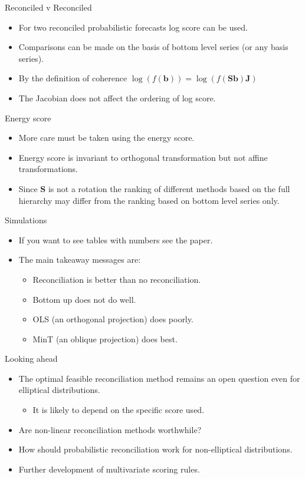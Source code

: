\documentclass{beamer}
\begin{document}
  \begin{frame}{Reconciled v Reconciled}
	\begin{itemize}
		\item For two reconciled probabilistic forecasts log score can be used.
		\item Comparisons can be made on the basis of bottom level series (or any basis series).
		\item By the definition of coherence $\log (f({\bm b}))=\log (f({\bm S}{\bm b}){\bm J})$
		\item The Jacobian does not affect the ordering of log score.
	\end{itemize}
  \end{frame}
  \begin{frame}{Energy  score}
  	\begin{itemize}
  		\item More care must be taken using the energy score.
  		\item Energy score is invariant to orthogonal transformation but not affine transformations.
  		\item Since ${\bm S}$ is not a rotation the ranking of different methods based on the full hierarchy may differ from the ranking based on bottom level series only.
  	\end{itemize}
  \end{frame}
   \begin{frame}{Simulations}
   	\begin{itemize}
   		\item If you want to see tables with numbers see the paper.
   		\item The main takeaway messages are:
   		    \begin{itemize}
   		    	\item Reconciliation is better than no reconciliation.
   		    	\item Bottom up does not do well.
   		    	\item OLS (an orthogonal projection) does poorly.
   		    	\item MinT (an oblique projection) does best.
   		    \end{itemize} 
   	\end{itemize}
   \end{frame}
   \begin{frame}{Looking ahead}
     \begin{itemize}
     	\item The optimal feasible reconciliation method remains an open question even for elliptical distributions.
     	\begin{itemize}
     		\item It is likely to depend on the specific score used.
     	\end{itemize}
        \item Are non-linear reconciliation methods worthwhile?
        \item How should probabilistic reconciliation work for non-elliptical distributions.
        \item Further development of multivariate scoring rules.
     \end{itemize}	
   \end{frame}
\end{document}
